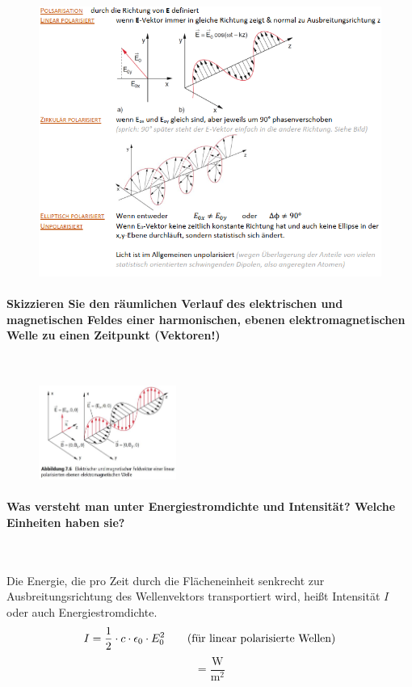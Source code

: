 \documentclass[a4paper, 11pt, ngerman, parskip=half-]{scrartcl}
\begin{document}
\begin{figure}[H]
    \centering
    \includegraphics[width=14cm]{image/13/3.png}
\end{figure}

\paragraph{Skizzieren Sie den räumlichen Verlauf des elektrischen und magnetischen Feldes einer
    harmonischen, ebenen elektromagnetischen Welle zu einen Zeitpunkt (Vektoren!)} ~

\begin{figure}[H]
    \centering
    \includegraphics[width=0.4\textwidth]{image/13/4.png}
\end{figure}

\paragraph{Was versteht man unter Energiestromdichte und Intensität? Welche Einheiten haben sie?} ~

Die Energie, die pro Zeit durch die Flächeneinheit senkrecht zur Ausbreitungsrichtung des
Wellenvektors transportiert wird, heißt Intensität $I$ oder auch Energiestromdichte.
\begin{equation}
    I = \frac{1}{2} \cdot c \cdot \epsilon_0 \cdot E_0^2 \qquad \text{(für linear polarisierte Wellen)} \\
\end{equation}
\begin{equation}
    [I] = \frac{\text{W}}{\text{m}^2}
\end{equation}
\end{document}

